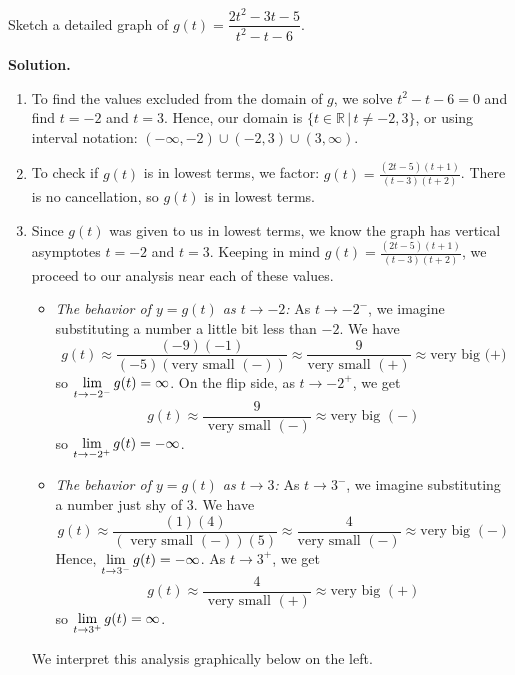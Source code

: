 \documentclass{ximera}
\begin{document}
\begin{ex}  Sketch a detailed graph of $g(t) = \dfrac{2t^2-3t-5}{t^2-t-6}$.

{\bf Solution.}

\begin{enumerate}

\item  To find the values excluded from the domain of $g$, we solve  $t^2-t-6 = 0$ and find $t = -2$ and $t=3$.  Hence, our domain is $\{ t \in \mathbb{R} \, | \, t \neq -2, 3 \}$, or using interval notation: $(-\infty, -2) \cup (-2,3) \cup (3,\infty)$.

\item  To check if $g(t)$ is in lowest terms, we factor:  $g(t) = \frac{(2t-5)(t+1)}{(t-3)(t+2)}$.  There is no cancellation, so $g(t)$ is in lowest terms.

\item  Since $g(t)$ was given to us in lowest terms, we know the graph has vertical asymptotes $t=-2$ and $t=3$.  Keeping in mind $g(t) = \frac{(2t-5)(t+1)}{(t-3)(t+2)}$, we proceed to our analysis near each of these values.

\begin{itemize}

\item  \textit{The behavior of $y=g(t)$ as $t \rightarrow -2$:}  As $t \rightarrow -2^{-}$, we imagine substituting a number a little bit less than $-2$. We have \[g(t) \approx \frac{(-9)(-1)}{(-5)(\text{very small $(-)$})} \approx \frac{9}{\text{very small $(+)$}} \approx \text{very big (+)}\] so  $\ds{ \lim_{t \rightarrow -2^{-}} g(t) = \infty}$. On the flip side, as $t \rightarrow -2^{+}$, we get \[g(t) \approx \frac{9}{\text{ very small $(-)$}} \approx \text{very big $(-)$}\] so  $\ds{ \lim_{t \rightarrow -2^{+}} g(t) = -\infty}$.

\item  \textit{The behavior of $y=g(t)$ as $t \rightarrow 3$:}  As $t \rightarrow 3^{-}$, we imagine substituting a  number just shy  of $3$. We have \[g(t) \approx \frac{(1)(4)}{(\text{ very small $(-)$}) (5)} \approx \frac{4}{\text{very small $(-)$}} \approx \text{very big $(-)$}\] Hence, $\ds{ \lim_{t \rightarrow 3^{-}} g(t) = -\infty}$. As $t \rightarrow 3^{+}$, we get \[g(t) \approx \frac{4}{\text{ very small $(+)$}} \approx \text{very big $(+)$}\] so  $\ds{ \lim_{t \rightarrow 3^{+}} g(t) = \infty}$.

\end{itemize}

We interpret this analysis graphically below on the left.



\end{enumerate}
\end{ex}
\end{document}
